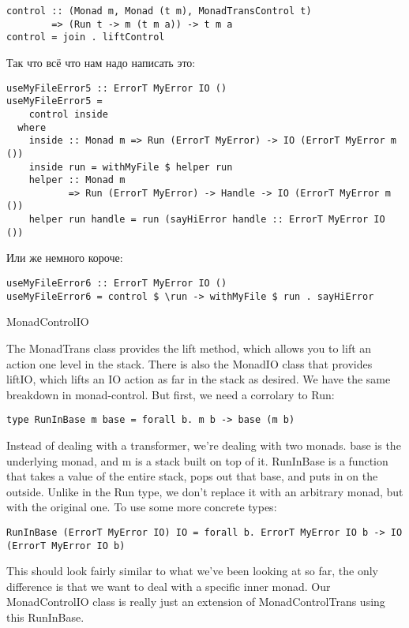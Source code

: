 \begin{lstlisting}
control :: (Monad m, Monad (t m), MonadTransControl t)
        => (Run t -> m (t m a)) -> t m a
control = join . liftControl
\end{lstlisting}

Так что всё что нам надо написать это:

\begin{lstlisting}
useMyFileError5 :: ErrorT MyError IO ()
useMyFileError5 =
    control inside
  where
    inside :: Monad m => Run (ErrorT MyError) -> IO (ErrorT MyError m ())
    inside run = withMyFile $ helper run
    helper :: Monad m
           => Run (ErrorT MyError) -> Handle -> IO (ErrorT MyError m ())
    helper run handle = run (sayHiError handle :: ErrorT MyError IO ())
\end{lstlisting}

Или же немного короче:

\begin{lstlisting}
useMyFileError6 :: ErrorT MyError IO ()
useMyFileError6 = control $ \run -> withMyFile $ run . sayHiError
\end{lstlisting}

MonadControlIO

The MonadTrans class provides the lift method, which allows you to lift an action one level in the stack. There is also the MonadIO class that provides liftIO, which lifts an IO action as far in the stack as desired. We have the same breakdown in monad-control. But first, we need a corrolary to Run:

\begin{lstlisting}
type RunInBase m base = forall b. m b -> base (m b)
\end{lstlisting}

Instead of dealing with a transformer, we're dealing with two monads. base is the underlying monad, and m is a stack built on top of it. RunInBase is a function that takes a value of the entire stack, pops out that base, and puts in on the outside. Unlike in the Run type, we don't replace it with an arbitrary monad, but with the original one. To use some more concrete types:

\begin{lstlisting}
RunInBase (ErrorT MyError IO) IO = forall b. ErrorT MyError IO b -> IO (ErrorT MyError IO b)
\end{lstlisting}

This should look fairly similar to what we've been looking at so far, the only difference is that we want to deal with a specific inner monad. Our MonadControlIO class is really just an extension of MonadControlTrans using this RunInBase.

